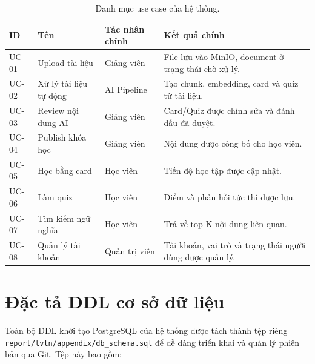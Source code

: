 \begin{table}[H]
    \centering
    \caption*{Danh mục use case của hệ thống.}
    \begin{tabular}{|p{1.3cm}|p{3.8cm}|p{2.5cm}|p{5.6cm}|}
        \hline
        \textbf{ID} & \textbf{Tên} & \textbf{Tác nhân chính} & \textbf{Kết quả chính} \\
        \hline
        UC-01 & Upload tài liệu & Giảng viên & File lưu vào MinIO, document ở trạng thái chờ xử lý. \\
        \hline
        UC-02 & Xử lý tài liệu tự động & AI Pipeline & Tạo chunk, embedding, card và quiz từ tài liệu. \\
        \hline
        UC-03 & Review nội dung AI & Giảng viên & Card/Quiz được chỉnh sửa và đánh dấu đã duyệt. \\
        \hline
        UC-04 & Publish khóa học & Giảng viên & Nội dung được công bố cho học viên. \\
        \hline
        UC-05 & Học bằng card & Học viên & Tiến độ học tập được cập nhật. \\
        \hline
        UC-06 & Làm quiz & Học viên & Điểm và phản hồi tức thì được lưu. \\
        \hline
        UC-07 & Tìm kiếm ngữ nghĩa & Học viên & Trả về top-K nội dung liên quan. \\
        \hline
        UC-08 & Quản lý tài khoản & Quản trị viên & Tài khoản, vai trò và trạng thái người dùng được quản lý. \\
        \hline
    \end{tabular}
\end{table}

\section*{Đặc tả DDL cơ sở dữ liệu}
\label{appendix:db-schema}

Toàn bộ DDL khởi tạo PostgreSQL của hệ thống được tách thành tệp riêng
\texttt{report/lvtn/appendix/db\_schema.sql} để dễ dàng triển khai và
quản lý phiên bản qua Git. Tệp này bao gồm:

